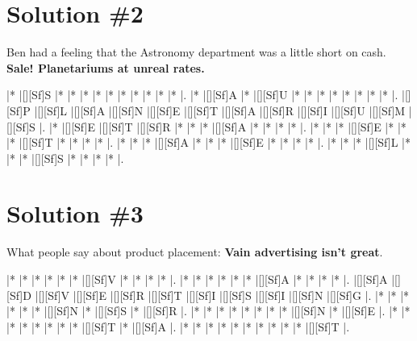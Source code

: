 \documentclass[letterpaper]{article}
\begin{document}
\newpage
\section*{Solution \#2}
Ben had a feeling that the Astronomy department was a little short on cash.
\newline\textbf{Sale! Planetariums at unreal rates.}

\vspace*{1em}
\begin{Puzzle}{12}{8}
|*        |[][Sf]S  |*        |*        |*        |*        |*        |*        |*        |*        |*        |*        |.
|*        |[][Sf]A  |*        |[][Sf]U  |*        |*        |*        |*        |*        |*        |*        |*        |.
|[][Sf]P  |[][Sf]L  |[][Sf]A  |[][Sf]N  |[][Sf]E  |[][Sf]T  |[][Sf]A  |[][Sf]R  |[][Sf]I  |[][Sf]U  |[][Sf]M  |[][Sf]S  |.
|*        |[][Sf]E  |[][Sf]T  |[][Sf]R  |*        |*        |*        |[][Sf]A  |*        |*        |*        |*        |.
|*        |*        |*        |[][Sf]E  |*        |*        |*        |[][Sf]T  |*        |*        |*        |*        |.
|*        |*        |*        |[][Sf]A  |*        |*        |*        |[][Sf]E  |*        |*        |*        |*        |.
|*        |*        |*        |[][Sf]L  |*        |*        |*        |[][Sf]S  |*        |*        |*        |*        |.
\end{Puzzle}

\newpage
\section*{Solution \#3}
What people say about product placement:
\newline\textbf{Vain advertising isn't great}.
\vspace*{1em}
\begin{Puzzle}{11}{7}
|*        |*        |*        |*        |*        |*        |[][Sf]V  |*        |*        |*        |*        |.
|*        |*        |*        |*        |*        |*        |[][Sf]A  |*        |*        |*        |*        |.  
|[][Sf]A  |[][Sf]D  |[][Sf]V  |[][Sf]E  |[][Sf]R  |[][Sf]T  |[][Sf]I  |[][Sf]S  |[][Sf]I  |[][Sf]N  |[][Sf]G  |.
|*        |*        |*        |*        |*        |*        |[][Sf]N  |*        |[][Sf]S  |*        |[][Sf]R  |. 
|*        |*        |*        |*        |*        |*        |*        |*        |[][Sf]N  |*        |[][Sf]E  |.
|*        |*        |*        |*        |*        |*        |*        |*        |[][Sf]T  |*        |[][Sf]A  |.
|*        |*        |*        |*        |*        |*        |*        |*        |*        |*        |[][Sf]T  |.
\end{Puzzle}
\end{document}
